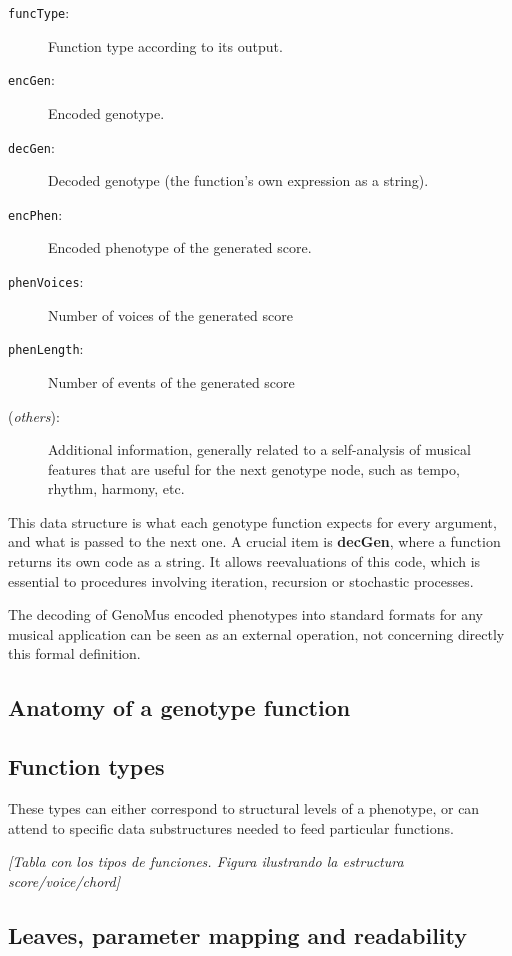 \documentclass{article}
\begin{document}
\begin{description}
\item[\texttt{funcType}:] Function type according to its output.
\item[\texttt{encGen}:] Encoded genotype. 
\item[\texttt{decGen}:] Decoded genotype (the function's own expression as a string).
\item[\texttt{encPhen}:] Encoded phenotype of the generated score.
\item[\texttt{phenVoices}:] Number of voices of the generated score
\item[\texttt{phenLength}:] Number of events of the generated score
\item[(\emph{others}):] Additional information, generally related to a self-analysis of musical features that are useful for the next genotype node, such as tempo, rhythm, harmony, etc.

\end{description}

This data structure is what each genotype function expects for every argument, and what is passed to the next one. A crucial item is \textbf{decGen}, where a function returns its own code as a string. It allows reevaluations of this code, which is essential to procedures involving iteration, recursion or stochastic processes.

The decoding of GenoMus encoded phenotypes into standard formats for any musical application can be seen as an external operation, not concerning directly this formal definition. 


\subsection{Anatomy of a genotype function}

\subsection{Function types}


These types can either correspond to structural levels of a phenotype, or can attend to specific data substructures needed to feed particular functions.

{\color{gray} \textsl{[Tabla con los tipos de funciones. Figura ilustrando la estructura score/voice/chord]}}

\subsection{Leaves, parameter mapping and readability}
\end{document}
